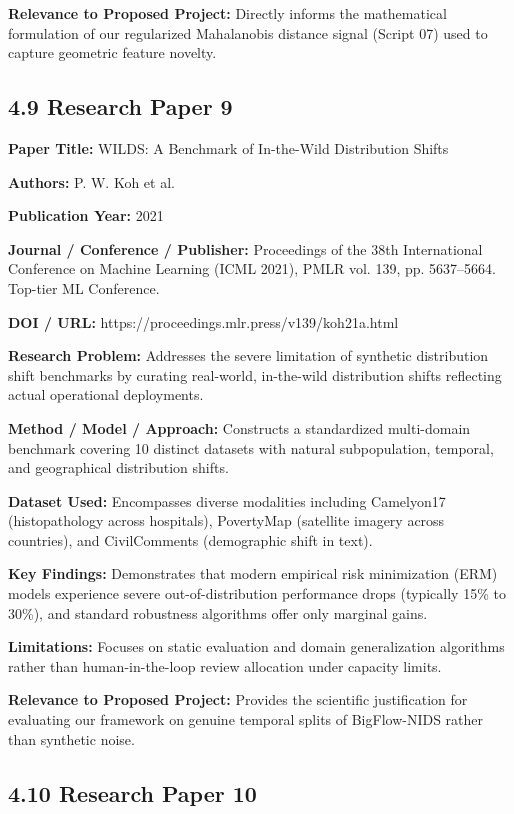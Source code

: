 \textbf{Relevance to Proposed Project:} Directly informs the mathematical formulation of our regularized Mahalanobis distance signal (Script 07) used to capture geometric feature novelty.

\subsection{4.9 Research Paper 9}

\textbf{Paper Title:} WILDS: A Benchmark of In-the-Wild Distribution Shifts

\textbf{Authors:} P. W. Koh et al.

\textbf{Publication Year:} 2021

\textbf{Journal / Conference / Publisher:} Proceedings of the 38th International Conference on Machine Learning (ICML 2021), PMLR vol. 139, pp. 5637--5664. Top-tier ML Conference.

\textbf{DOI / URL:} https://proceedings.mlr.press/v139/koh21a.html

\textbf{Research Problem:} Addresses the severe limitation of synthetic distribution shift benchmarks by curating real-world, in-the-wild distribution shifts reflecting actual operational deployments.

\textbf{Method / Model / Approach:} Constructs a standardized multi-domain benchmark covering 10 distinct datasets with natural subpopulation, temporal, and geographical distribution shifts.

\textbf{Dataset Used:} Encompasses diverse modalities including Camelyon17 (histopathology across hospitals), PovertyMap (satellite imagery across countries), and CivilComments (demographic shift in text).

\textbf{Key Findings:} Demonstrates that modern empirical risk minimization (ERM) models experience severe out-of-distribution performance drops (typically 15\% to 30\%), and standard robustness algorithms offer only marginal gains.

\textbf{Limitations:} Focuses on static evaluation and domain generalization algorithms rather than human-in-the-loop review allocation under capacity limits.

\textbf{Relevance to Proposed Project:} Provides the scientific justification for evaluating our framework on genuine temporal splits of BigFlow-NIDS rather than synthetic noise.

\subsection{4.10 Research Paper 10}

